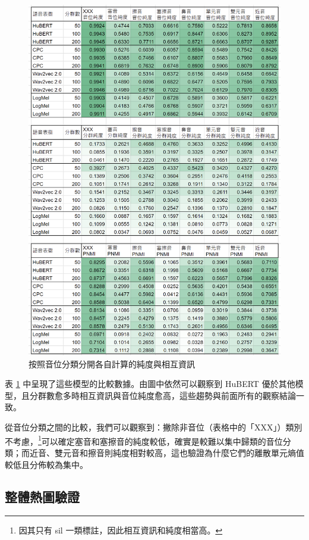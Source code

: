\begin{figure}
    \centering
    \includegraphics[width=1\linewidth]{figures/pur-of-each-cls-xls.png}
     \caption{按照音位分類分開各自計算的純度與相互資訊}
     \label{fig:pur-of-each-cls}
\end{figure}


        表 \ref{fig:pur-of-each-cls} 中呈現了這些模型的比較數據。由圖中依然可以觀察到 HuBERT 優於其他模型，且分群數愈多時相互資訊與音位純度愈高，這些趨勢與前面所有的觀察結論一致。

        從音位分類之間的比較，我們可以觀察到：撇除非音位（表格中的「XXX」）類別不考慮，\footnote{因其只有 sil 一類標註，因此相互資訊和純度相當高。}可以確定塞音和塞擦音的純度較低，確實是較難以集中歸類的音位分類；而近音、雙元音和擦音則純度相對較高，這也驗證為什麼它們的離散單元熵值較低且分佈較為集中。

\subsection{整體熱圖驗證}

